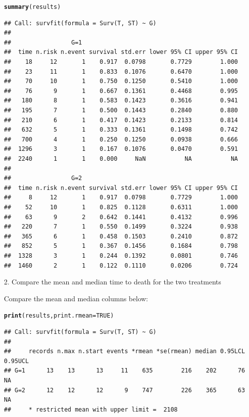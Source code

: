 \documentclass{article}\usepackage{graphicx, color}
\makeatletter
\newcommand{\hlfunctioncall}[1]{\textcolor[rgb]{0.501960784313725,0,0.329411764705882}{\textbf{#1}}}%
\newenvironment{kframe}{%
 \def\at@end@of@kframe{}%
 \ifinner\ifhmode%
  \def\at@end@of@kframe{\end{minipage}}%
  \begin{minipage}{\columnwidth}%
 \fi\fi%
 \def\FrameCommand##1{\hskip\@totalleftmargin \hskip-\fboxsep
 \colorbox{shadecolor}{##1}\hskip-\fboxsep
     \hskip-\linewidth \hskip-\@totalleftmargin \hskip\columnwidth}%
 \MakeFramed {\advance\hsize-\width
   \@totalleftmargin\z@ \linewidth\hsize
   \@setminipage}}%
 {\par\unskip\endMakeFramed%
 \at@end@of@kframe}
\newenvironment{knitrout}{}{} %
\makeatother
\begin{document}
\begin{shaded}
\begin{knitrout}
\color{fgcolor}\begin{kframe}
\begin{alltt}
\hlfunctioncall{summary}(results)
\end{alltt}
\begin{verbatim}
## Call: survfit(formula = Surv(T, ST) ~ G)
## 
##                 G=1 
##  time n.risk n.event survival std.err lower 95% CI upper 95% CI
##    18     12       1    0.917  0.0798       0.7729        1.000
##    23     11       1    0.833  0.1076       0.6470        1.000
##    70     10       1    0.750  0.1250       0.5410        1.000
##    76      9       1    0.667  0.1361       0.4468        0.995
##   180      8       1    0.583  0.1423       0.3616        0.941
##   195      7       1    0.500  0.1443       0.2840        0.880
##   210      6       1    0.417  0.1423       0.2133        0.814
##   632      5       1    0.333  0.1361       0.1498        0.742
##   700      4       1    0.250  0.1250       0.0938        0.666
##  1296      3       1    0.167  0.1076       0.0470        0.591
##  2240      1       1    0.000     NaN           NA           NA
## 
##                 G=2 
##  time n.risk n.event survival std.err lower 95% CI upper 95% CI
##     8     12       1    0.917  0.0798       0.7729        1.000
##    52     10       1    0.825  0.1128       0.6311        1.000
##    63      9       2    0.642  0.1441       0.4132        0.996
##   220      7       1    0.550  0.1499       0.3224        0.938
##   365      6       1    0.458  0.1503       0.2410        0.872
##   852      5       1    0.367  0.1456       0.1684        0.798
##  1328      3       1    0.244  0.1392       0.0801        0.746
##  1460      2       1    0.122  0.1110       0.0206        0.724
\end{verbatim}
\end{kframe}
\end{knitrout}

 
\end{shaded}
\item[2.] Compare the mean and median time to death for the two treatments\begin{shaded}
Compare the mean and median columns below:
\begin{knitrout}
\color{fgcolor}\begin{kframe}
\begin{alltt}
\hlfunctioncall{print}(results, print.rmean = TRUE)
\end{alltt}
\begin{verbatim}
## Call: survfit(formula = Surv(T, ST) ~ G)
## 
##     records n.max n.start events *rmean *se(rmean) median 0.95LCL 0.95UCL
## G=1      13    13      13     11    635        216    202      76      NA
## G=2      12    12      12      9    747        226    365      63      NA
##     * restricted mean with upper limit =  2108
\end{verbatim}
\end{kframe}
\end{knitrout}

\end{shaded}
\end{document}

